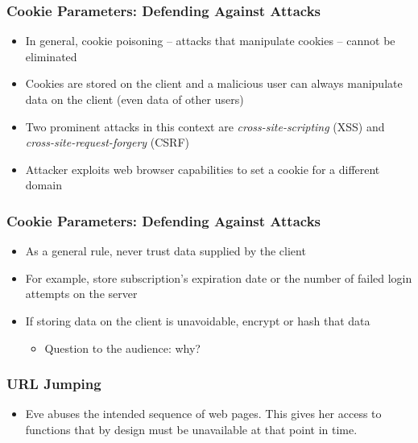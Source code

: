 \begin{frame}
    \frametitle{Cookie Parameters: Defending Against Attacks}
    \begin{itemize}
        \item In general, cookie poisoning -- attacks that manipulate cookies -- cannot be eliminated
        \item Cookies are stored on the client and a malicious user can always manipulate data on the client (even data of other users)
        \item Two prominent attacks in this context are \textit{cross-site-scripting} (XSS) and \textit{cross-site-request-forgery} (CSRF)
        \item Attacker exploits web browser capabilities to set a cookie for a different domain
    \end{itemize}
\end{frame}

\begin{frame}
    \frametitle{Cookie Parameters: Defending Against Attacks}
    \begin{itemize}
        \item As a general rule, never trust data supplied by the client
        \item For example, store subscription's expiration date or the number of failed login attempts on the server
        \item If storing data on the client is unavoidable, encrypt or hash that data
        \begin{itemize}
            \item Question to the audience: why?
        \end{itemize} 
    \end{itemize}
\end{frame}




\begin{frame}
    \frametitle{URL Jumping}
    \begin{itemize}
        \item Eve abuses the intended sequence of web pages. This gives her access to functions that by design must be unavailable at that point in time. 
    \end{itemize}
\end{frame}

